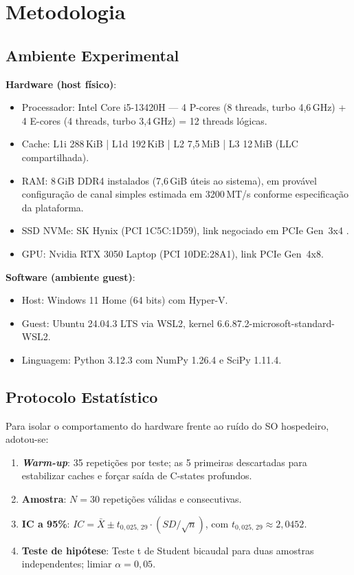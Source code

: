 \documentclass[
	12pt,
	openright,
	oneside,
	a4paper,
	english,
	brazil
	]{abntex2}
\begin{document}
\chapter{Metodologia}
\label{chap:metodologia}

\section{Ambiente Experimental}
\label{sec:ambiente}

\textbf{Hardware (host físico)}:
\begin{itemize}
    \item Processador: Intel Core i5-13420H — 4 P-cores (8 threads, turbo 4,6\,GHz) + 4 E-cores (4 threads, turbo 3,4\,GHz) = 12 threads lógicas.
    \item Cache: L1i 288\,KiB | L1d 192\,KiB | L2 7,5\,MiB | L3 12\,MiB (LLC compartilhada).
    \item RAM: 8\,GiB DDR4 instalados (7,6\,GiB úteis ao sistema), em provável configuração de canal simples estimada em 3200\,MT/s conforme especificação da plataforma.
    \item SSD NVMe: SK Hynix (PCI 1C5C:1D59), link negociado em PCIe Gen~3x4 \cite{budruk2003}.
    \item GPU: Nvidia RTX 3050 Laptop (PCI 10DE:28A1), link PCIe Gen~4x8.
\end{itemize}

\textbf{Software (ambiente guest)}:
\begin{itemize}
    \item Host: Windows 11 Home (64 bits) com Hyper-V.
    \item Guest: Ubuntu 24.04.3 LTS via WSL2, kernel 6.6.87.2-microsoft-standard-WSL2.
    \item Linguagem: Python 3.12.3 com NumPy 1.26.4 e SciPy 1.11.4.
\end{itemize}

\section{Protocolo Estatístico}
\label{sec:protocolo}

Para isolar o comportamento do hardware frente ao ruído do SO hospedeiro, adotou-se:

\begin{enumerate}
    \item \textbf{\textit{Warm-up}}: 35 repetições por teste; as 5 primeiras descartadas para estabilizar caches e forçar saída de C-states profundos.
    \item \textbf{Amostra}: $N = 30$ repetições válidas e consecutivas.
    \item \textbf{IC a 95\%}: $IC = \bar{X} \pm t_{0{,}025,\,29} \cdot (SD/\sqrt{n})$, com $t_{0{,}025,\,29} \approx 2{,}0452$.
    \item \textbf{Teste de hipótese}: Teste t de Student bicaudal para duas amostras independentes; limiar $\alpha = 0{,}05$.
\end{enumerate}
\end{document}

